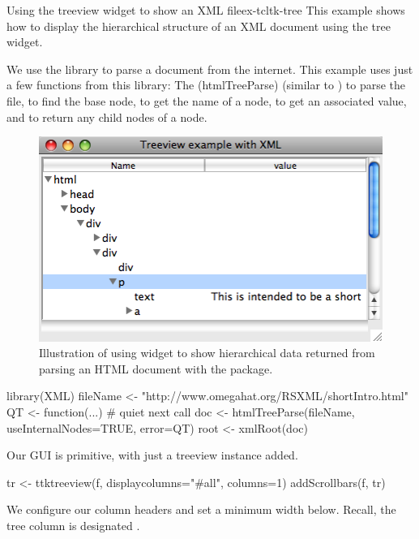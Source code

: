 \begin{example}{Using the treeview widget to show an XML file}{ex-tcltk-tree}
This example shows how to display the hierarchical structure of an XML
document using the tree widget.

We use the  library to parse a document from the
internet. This example uses just a few functions from this library:
The \function(htmlTreeParse) (similar to ) to parse the file, 
 to find the base node,
 to get the name of a node, 
 to get an associated value, and
 to return any child nodes of a node.



\begin{figure}
  \centering
  \includegraphics[width=.7\textwidth]{fig-tcltk-xml-viewer.png}
  \caption{Illustration of using  widget to show
    hierarchical data returned from parsing an HTML document with the
     package.}
  \label{fig:fig-tcltk-xml-viewer}
\end{figure}
\begin{Schunk}
\begin{Sinput}
 library(XML)
 fileName <- "http://www.omegahat.org/RSXML/shortIntro.html"
 QT <- function(...) {}  # quiet next call
 doc <- htmlTreeParse(fileName, useInternalNodes=TRUE, error=QT)
 root <- xmlRoot(doc)
\end{Sinput}
\end{Schunk}
Our GUI is primitive, with just a treeview instance added.
\begin{Schunk}
\begin{Sinput}
 tr <- ttktreeview(f, displaycolumns="#all", columns=1)
 addScrollbars(f, tr)                    
\end{Sinput}
\end{Schunk}

We configure our column headers and set a minimum
width below. Recall, the tree column is designated .
\begin{Schunk}
\end{Schunk}


\end{example}
